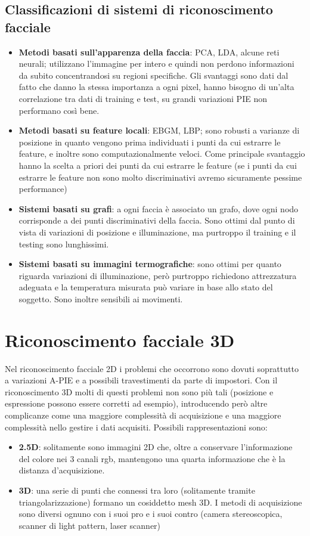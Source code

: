 \documentclass{article}
\begin{document}
\subsection{Classificazioni di sistemi di riconoscimento facciale}
\begin{itemize}
    \item \textbf{Metodi basati sull'apparenza della faccia}: PCA, LDA, alcune reti neurali; utilizzano l'immagine per intero e quindi non perdono informazioni da subito concentrandosi su regioni specifiche. Gli svantaggi sono dati dal fatto che danno la stessa importanza a ogni pixel, hanno bisogno di un'alta correlazione tra dati di training e test, su grandi variazioni PIE non performano così bene.
    \item \textbf{Metodi basati su feature locali}: EBGM, LBP; sono robusti a varianze di posizione in quanto vengono prima individuati i punti da cui estrarre le feature, e inoltre sono computazionalmente veloci. Come principale svantaggio hanno la scelta a priori dei punti da cui estrarre le feature (se i punti da cui estrarre le feature non sono molto discriminativi avremo sicuramente pessime performance)
    \item \textbf{Sistemi basati su grafi}: a ogni faccia è associato un grafo, dove ogni nodo corrisponde a dei punti discriminativi della faccia. Sono ottimi dal punto di vista di variazioni di posizione e illuminazione, ma purtroppo il training e il testing sono lunghissimi.
    \item \textbf{Sistemi basati su immagini termografiche}: sono ottimi per quanto riguarda variazioni di illuminazione, però purtroppo richiedono attrezzatura adeguata e la temperatura misurata può variare in base allo stato del soggetto. Sono inoltre sensibili ai movimenti. 
\end{itemize}

\section{Riconoscimento facciale 3D}
Nel riconoscimento facciale 2D i problemi che occorrono sono dovuti soprattutto a variazioni A-PIE e a possibili travestimenti da parte di impostori. Con il riconoscimento 3D molti di questi problemi non sono più tali (posizione e espressione possono essere corretti ad esempio), introducendo però altre complicanze come una maggiore complessità di acquisizione e una maggiore complessità nello gestire i dati acquisiti. Possibili rappresentazioni sono:
\begin{itemize}
    \item \textbf{2.5D}: solitamente sono immagini 2D che, oltre a conservare l'informazione del colore nei 3 canali rgb, mantengono una quarta informazione che è la distanza d'acquisizione.
    \item \textbf{3D}: una serie di punti che connessi tra loro (solitamente tramite triangolarizzazione) formano un cosiddetto mesh 3D. I metodi di acquisizione sono diversi ognuno con i suoi pro e i suoi contro (camera stereoscopica, scanner di light pattern, laser scanner)
\end{itemize}
\end{document}
